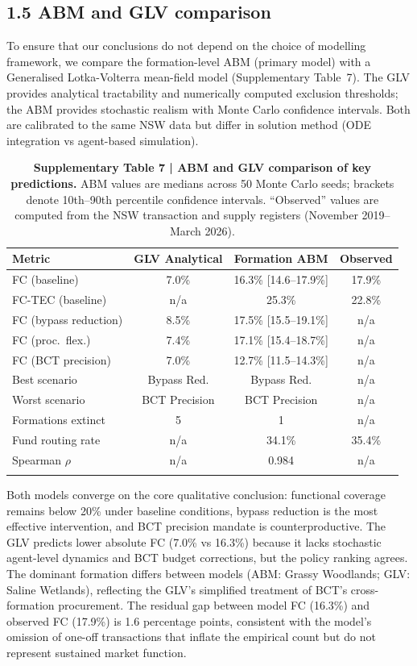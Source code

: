 \documentclass[pdflatex,sn-nature,oneside]{sn-jnl}
\begin{document}
\subsection*{1.5 ABM and GLV comparison}

To ensure that our conclusions do not depend on the choice of modelling
framework, we compare the formation-level ABM (primary model) with a
Generalised Lotka-Volterra mean-field model (Supplementary Table~7).
The GLV provides analytical tractability and numerically computed
exclusion thresholds; the ABM provides stochastic realism with Monte Carlo
confidence intervals. Both are calibrated to the same NSW data but
differ in solution method (ODE integration vs agent-based simulation).

\begin{table}[h]
\caption{%
  \textbf{Supplementary Table 7 | ABM and GLV comparison of key predictions.}
  ABM values are medians across 50 Monte Carlo seeds; brackets denote
  10th--90th percentile confidence intervals. ``Observed'' values are computed
  from the NSW transaction and supply registers (November 2019--March 2026).
}\label{tab:supp_three_model}
\begin{tabular}{@{}lccc@{}}
\toprule
Metric & GLV Analytical & Formation ABM & Observed \\
\midrule
FC (baseline) & 7.0\% & 16.3\% [14.6--17.9\%] & 17.9\% \\
FC-TEC (baseline) & n/a & 25.3\% & 22.8\% \\
FC (bypass reduction) & 8.5\% & 17.5\% [15.5--19.1\%] & n/a \\
FC (proc.\ flex.) & 7.4\% & 17.1\% [15.4--18.7\%] & n/a \\
FC (BCT precision) & 7.0\% & 12.7\% [11.5--14.3\%] & n/a \\
Best scenario & Bypass Red. & Bypass Red. & n/a \\
Worst scenario & BCT Precision & BCT Precision & n/a \\
Formations extinct & 5 & 1 & n/a \\
Fund routing rate & n/a & 34.1\% & 35.4\% \\
Spearman $\rho$ & n/a & 0.984 & n/a \\
\botrule
\end{tabular}
\end{table}

Both models converge on the core qualitative conclusion: functional coverage
remains below 20\% under baseline conditions, bypass reduction is the most
effective intervention, and BCT precision mandate is counterproductive.
The GLV predicts lower absolute FC (7.0\% vs 16.3\%) because it lacks
stochastic agent-level dynamics and BCT budget corrections, but the
policy ranking agrees.
The dominant formation differs between models (ABM: Grassy Woodlands;
GLV: Saline Wetlands), reflecting the GLV's simplified treatment of
BCT's cross-formation procurement.
The residual gap between model FC (16.3\%) and observed FC (17.9\%) is
1.6 percentage points, consistent with the model's omission of one-off
transactions that inflate the empirical count but do not represent
sustained market function.
\end{document}
